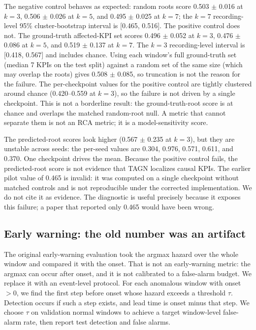 \documentclass[conference]{IEEEtran}
\begin{document}
The negative control behaves as expected: random roots score 0.503 $\pm$ 0.016 at $k=3$, 0.506 $\pm$ 0.026 at $k=5$, and 0.495 $\pm$ 0.025 at $k=7$; the $k=7$ recording-level 95\% cluster-bootstrap interval is [0.465, 0.516]. The positive control does not. The ground-truth affected-KPI set scores 0.496 $\pm$ 0.052 at $k=3$, 0.476 $\pm$ 0.086 at $k=5$, and 0.519 $\pm$ 0.137 at $k=7$. The $k=3$ recording-level interval is [0.418, 0.567] and includes chance. Using each window's full ground-truth set (median 7 KPIs on the test split) against a random set of the same size (which may overlap the roots) gives 0.508 $\pm$ 0.085, so truncation is not the reason for the failure. The per-checkpoint values for the positive control are tightly clustered around chance (0.420--0.559 at $k=3$), so the failure is not driven by a single checkpoint. This is not a borderline result: the ground-truth-root score is at chance and overlaps the matched random-root null. A metric that cannot separate them is not an RCA metric; it is a model-sensitivity score.

The predicted-root scores look higher (0.567 $\pm$ 0.235 at $k=3$), but they are unstable across seeds: the per-seed values are 0.304, 0.976, 0.571, 0.611, and 0.370. One checkpoint drives the mean. Because the positive control fails, the predicted-root score is not evidence that TAGN localizes causal KPIs. The earlier pilot value of 0.465 is invalid: it was computed on a single checkpoint without matched controls and is not reproducible under the corrected implementation. We do not cite it as evidence. The diagnostic is useful precisely because it exposes this failure; a paper that reported only 0.465 would have been wrong.

\subsection{Early warning: the old number was an artifact}

The original early-warning evaluation took the argmax hazard over the whole window and compared it with the onset. That is not an early-warning metric: the argmax can occur after onset, and it is not calibrated to a false-alarm budget. We replace it with an event-level protocol. For each anomalous window with onset $>0$, we find the first step before onset whose hazard exceeds a threshold $\tau$. Detection occurs if such a step exists, and lead time is onset minus that step. We choose $\tau$ on validation normal windows to achieve a target window-level false-alarm rate, then report test detection and false alarms.
\end{document}

